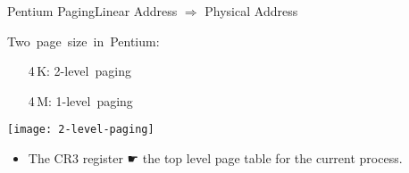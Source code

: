 
\begin{frame}{Pentium Paging}{Linear Address $\Rightarrow$ Physical Address}
  \begin{minipage}{.4\textwidth}
    \mbox{Two page size in Pentium:}
    \begin{small}
      \begin{itemize}
      \item[4\,K:] \mbox{2-level paging}%
      \item[4\,M:] \mbox{1-level paging}%
      \end{itemize}
    \end{small}
    \begin{center}
      \texttt{[image: 2-level-paging]}
    \end{center}
  \end{minipage}\quad
  \begin{minipage}{.5\textwidth}
    \begin{center}
    \end{center}
  \end{minipage}
\end{frame}

\begin{itemize}
\item The CR3 register {☛} the top level page table for the current process.
\end{itemize}

